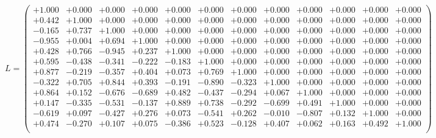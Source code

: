 \documentclass[9pt]{article}
\theoremstyle{plain}
\theoremstyle{definition}
\theoremstyle{remark}
\numberwithin{equation}{section}
\begin{document}
$L = \left(
\begin{array}{
cccccccccccc}
+1.000 & +0.000 & +0.000 & +0.000 & +0.000 & +0.000 & +0.000 & +0.000 & +0.000 & +0.000 & +0.000 & +0.000 \\
+0.442 & +1.000 & +0.000 & +0.000 & +0.000 & +0.000 & +0.000 & +0.000 & +0.000 & +0.000 & +0.000 & +0.000 \\
-0.165 & +0.737 & +1.000 & +0.000 & +0.000 & +0.000 & +0.000 & +0.000 & +0.000 & +0.000 & +0.000 & +0.000 \\
-0.955 & +0.004 & +0.694 & +1.000 & +0.000 & +0.000 & +0.000 & +0.000 & +0.000 & +0.000 & +0.000 & +0.000 \\
+0.428 & +0.766 & -0.945 & +0.237 & +1.000 & +0.000 & +0.000 & +0.000 & +0.000 & +0.000 & +0.000 & +0.000 \\
+0.595 & -0.438 & -0.341 & -0.222 & -0.183 & +1.000 & +0.000 & +0.000 & +0.000 & +0.000 & +0.000 & +0.000 \\
+0.877 & -0.219 & -0.357 & +0.404 & +0.073 & +0.769 & +1.000 & +0.000 & +0.000 & +0.000 & +0.000 & +0.000 \\
-0.322 & +0.705 & +0.844 & +0.393 & -0.191 & -0.890 & -0.323 & +1.000 & +0.000 & +0.000 & +0.000 & +0.000 \\
+0.864 & +0.152 & -0.676 & -0.689 & +0.482 & -0.437 & -0.294 & +0.067 & +1.000 & +0.000 & +0.000 & +0.000 \\
+0.147 & -0.335 & -0.531 & -0.137 & +0.889 & +0.738 & -0.292 & -0.699 & +0.491 & +1.000 & +0.000 & +0.000 \\
-0.619 & +0.097 & -0.427 & +0.276 & +0.073 & -0.541 & +0.262 & -0.010 & -0.807 & +0.132 & +1.000 & +0.000 \\
+0.474 & -0.270 & +0.107 & +0.075 & -0.386 & +0.523 & -0.128 & +0.407 & +0.062 & +0.163 & +0.492 & +1.000 \\
\end{array}
\right)$ \newline 
\end{document}
